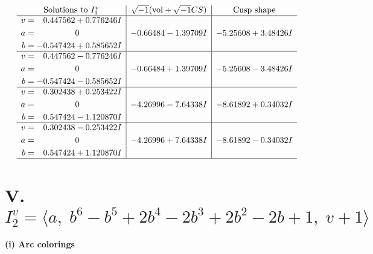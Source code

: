 \documentclass[1p]{elsarticle_modified}
\theoremstyle{definition}
\newcommand{\I}{\sqrt{-1}}
\begin{document}
$$\begin{array}{c|c|c}  
\text{Solutions to }I^v_{1}& \I (\text{vol} + \sqrt{-1}CS) & \text{Cusp shape}\\
 \hline 
\begin{aligned}
v &= \phantom{-}0.447562 + 0.776246 I \\
a &= \phantom{-0.000000 } 0 \\
b &= -0.547424 + 0.585652 I\end{aligned}
 & -0.66484 - 1.39709 I & -5.25608 + 3.48426 I \\ \hline\begin{aligned}
v &= \phantom{-}0.447562 - 0.776246 I \\
a &= \phantom{-0.000000 } 0 \\
b &= -0.547424 - 0.585652 I\end{aligned}
 & -0.66484 + 1.39709 I & -5.25608 - 3.48426 I \\ \hline\begin{aligned}
v &= \phantom{-}0.302438 + 0.253422 I \\
a &= \phantom{-0.000000 } 0 \\
b &= \phantom{-}0.547424 - 1.120870 I\end{aligned}
 & -4.26996 - 7.64338 I & -8.61892 + 0.34032 I \\ \hline\begin{aligned}
v &= \phantom{-}0.302438 - 0.253422 I \\
a &= \phantom{-0.000000 } 0 \\
b &= \phantom{-}0.547424 + 1.120870 I\end{aligned}
 & -4.26996 + 7.64338 I & -8.61892 - 0.34032 I\\
 \hline 
 \end{array}$$\newpage\newpage\renewcommand{\arraystretch}{1}
\centering \section*{V. $I^v_{2}= \langle a,\;b^6- b^5+2 b^4-2 b^3+2 b^2-2 b+1,\;v+1 \rangle$}
\flushleft \textbf{(i) Arc colorings}\\
\end{document}
